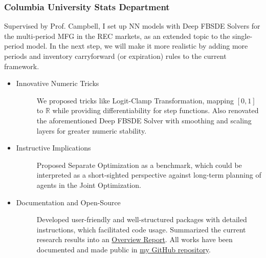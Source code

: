 \documentclass[10.5pt,a4paper]{article}
\newcommand{\MFG}{\href{https://github.com/OrangeAoo/Multi-Period-Compliance-MFG-FBSDEs}{my GitHub repository}}
\begin{document}
\subsubsection{Columbia University Stats Department}
\vspace{3pt}
    Supervised by Prof. Campbell, I set up NN models with Deep FBSDE Solvers for the multi-period MFG in the REC markets, as an extended topic to the single-period model. In the next step, we will make it more realistic by adding more periods and inventory carryforward (or expiration) rules to the current framework.
\begin{itemize}
    \item\begin{description}
        \item[Innovative Numeric Tricks] We proposed tricks like Logit-Clamp Transformation, mapping $[0,1]$ to $\mathbb{R}$ while providing differentiability for step functions. Also renovated the aforementioned Deep FBSDE Solver with smoothing and scaling layers for greater numeric stability.
    \end{description}
    \item \begin{description}
        \item[Instructive Implications] Proposed Separate Optimization as a benchmark, which could be interpreted as a short-sighted perspective against long-term planning of agents in the Joint Optimization.
    \end{description}
    \item \begin{description}
        \item[Documentation and Open-Source] Developed user-friendly and well-structured packages with detailed instructions, which facilitated code usage. Summarized the current research results into an \href{https://github.com/OrangeAoo/Multi-Compliance-MFG-FBSDEs/blob/FBSDE/FinalReports/ReportOverview-MFG-FBSDE.pdf}{Overview Report}. All works have been documented and made public in \MFG.  
    \end{description}
\end{itemize}
\end{document}
